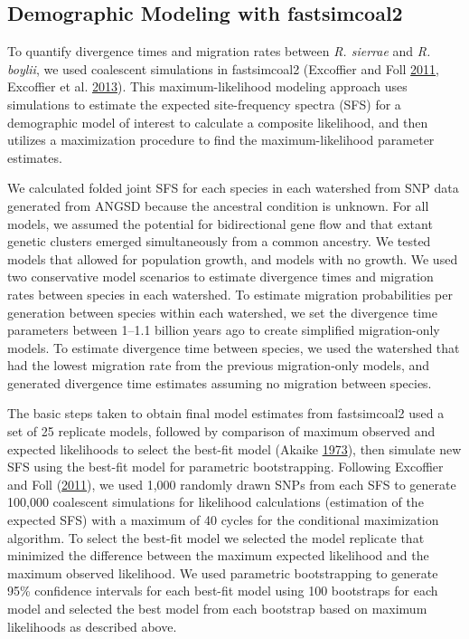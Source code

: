 \documentclass[proquest,12pt,final]{ucthesis-CA2012} %
\begin{document}
\begin{ucmainmatter}
\hypertarget{demographic-modeling-with-fastsimcoal2}{%
\subsection{Demographic Modeling with
fastsimcoal2}\label{demographic-modeling-with-fastsimcoal2}}

To quantify divergence times and migration rates between \emph{R.
sierrae} and \emph{R. boylii}, we used coalescent simulations in
fastsimcoal2 (Excoffier and Foll
\protect\hyperlink{ref-excoffier_fastsimcoal_2011}{2011}, Excoffier et
al. \protect\hyperlink{ref-excoffier_robust_2013}{2013}). This
maximum-likelihood modeling approach uses simulations to estimate the
expected site-frequency spectra (SFS) for a demographic model of
interest to calculate a composite likelihood, and then utilizes a
maximization procedure to find the maximum-likelihood parameter
estimates.

We calculated folded joint SFS for each species in each watershed from
SNP data generated from ANGSD because the ancestral condition is
unknown. For all models, we assumed the potential for bidirectional gene
flow and that extant genetic clusters emerged simultaneously from a
common ancestry. We tested models that allowed for population growth,
and models with no growth. We used two conservative model scenarios to
estimate divergence times and migration rates between species in each
watershed. To estimate migration probabilities per generation between
species within each watershed, we set the divergence time parameters
between 1--1.1 billion years ago to create simplified migration-only
models. To estimate divergence time between species, we used the
watershed that had the lowest migration rate from the previous
migration-only models, and generated divergence time estimates assuming
no migration between species.

The basic steps taken to obtain final model estimates from fastsimcoal2
used a set of 25 replicate models, followed by comparison of maximum
observed and expected likelihoods to select the best-fit model (Akaike
\protect\hyperlink{ref-akaike_information_1973}{1973}), then simulate
new SFS using the best-fit model for parametric bootstrapping. Following
Excoffier and Foll
(\protect\hyperlink{ref-excoffier_fastsimcoal_2011}{2011}), we used
1,000 randomly drawn SNPs from each SFS to generate 100,000 coalescent
simulations for likelihood calculations (estimation of the expected SFS)
with a maximum of 40 cycles for the conditional maximization algorithm.
To select the best-fit model we selected the model replicate that
minimized the difference between the maximum expected likelihood and the
maximum observed likelihood. We used parametric bootstrapping to
generate 95\% confidence intervals for each best-fit model using 100
bootstraps for each model and selected the best model from each
bootstrap based on maximum likelihoods as described above.


\end{ucmainmatter}
\end{document}
